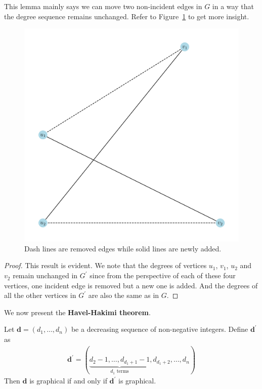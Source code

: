 \documentclass[thmcnt=section, 12pt, color=cyan]{my-elegantbook}
\begin{document}
This lemma mainly says we can move two 
non-incident edges in $G$ in a way that 
the degree sequence remains unchanged.
Refer to Figure~\ref{fig:7} to get more insight.

\begin{figure}[ht]
	\centering
	\includegraphics[scale=0.5]{figures/g-007.png}
	\caption{
		Dash lines are removed edges while
		solid lines are newly added.
	}
	\label{fig:7}
\end{figure}

\begin{proof}
	This result is evident. 
	We note that the degrees of vertices 
	$u_1$, $v_1$, $u_2$ and $v_2$ remain unchanged
	in $G^\prime$ since from the perspective of 
	each of these four vertices,
	one incident edge is removed but a new one is added.
	And the degrees of all the other vertices in $G^\prime$
	are also the same as in $G$.
\end{proof}


We now present 
the \textbf{Havel-Hakimi theorem}.

\begin{theorem} \label{thm:8}
	Let $\mathbf{d}=(d_1, \ldots, d_n)$
	be a decreasing sequence of non-negative integers. 
	Define $\mathbf{d}^\prime$ as 
	\begin{align*}
		\mathbf{d}^\prime
		= ( \underbrace{
			d_2 - 1, \ldots, d_{d_1 + 1} - 1
		}_{\text{$d_1$ terms}}, d_{d_1 + 2}, \ldots, d_n )
	\end{align*}
	Then $\mathbf{d}$ is graphical 
	if and only if $\mathbf{d}^\prime$ is graphical.
\end{theorem}
\end{document}
